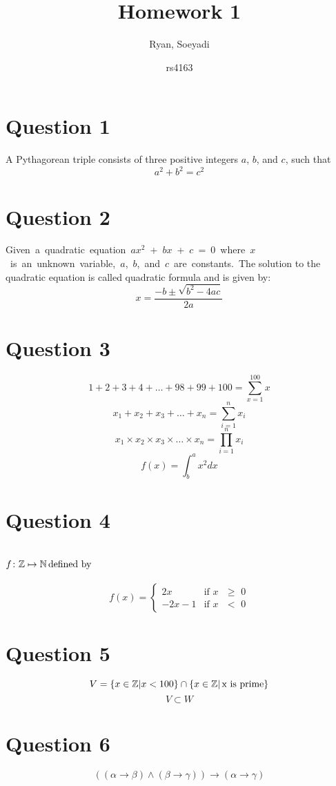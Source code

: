 \documentclass{article}
\title{Homework 1}
\author
{
Ryan, Soeyadi
\and rs4163
}
\newcommand{\Z}{\mathbb{Z}}
\newcommand{\N}{\mathbb{N}}
\begin{document}
    \maketitle
    
    \section*{Question 1}
    A Pythagorean triple consists of three positive integers $a$, $b$, and $c$, such that
    \[a^2+b^2=c^2\]
    \section*{Question 2}
    \mbox{Given a quadratic equation $ax^2$ + $bx$ + $c$ = 0 where $x$ is an unknown variable, $a$, $b$, and $c$ are constants. The} solution to the quadratic equation is called quadratic formula and is given by:
    \[x= \frac{-b \pm \sqrt{b^2 - 4ac}}{2a}\]
    \section*{Question 3}
    \[1 + 2 + 3 + 4 + \dots + 98 + 99 + 100 = \sum_{x=1}^{100}{x}\]
    \[x_1 + x_2 + x_3 + \dots + x_n = \sum_{i=1}^{n}{x_i}\]
    \[x_1 \times x_2 \times x_3 \times\dots\times x_n = \prod_{i=1}^{n}{x_i}\]
    \[f(x) = \int^a_b x^2dx\]
    \section*{Question 4}
   \section*{
    $f\colon \Z \mapsto \N \textit{\normalfont \,defined by}$ 
    }
    \[
    	f(x) =
	\begin{cases}
					2x & \text{if $x$ $\geq$ 0} \\
					-2x - 1 & \text{if $x$ $<$ 0}
	\end{cases}
	\]
     
  
 
    \section*{Question 5}
    \[V = \{ x \in \Z | x < 100 \} \cap \{ x \in \Z | \text{\,x is prime} \} \] 
    \[V \subset W\]
     \section*{Question 6}
    \[((\alpha\rightarrow\beta) \land (\beta\rightarrow\gamma)) \rightarrow (\alpha\rightarrow\gamma)\]
\end{document}
